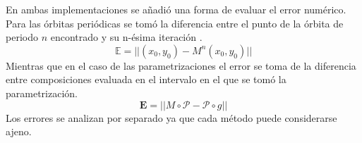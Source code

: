 En ambas implementaciones se añadi\'o una forma de evaluar el error num\'erico. Para las \'orbitas peri\'odicas se tom\'o la diferencia entre el punto de la \'orbita de periodo $n$ encontrado y su n-\'esima iteraci\'on .
\begin{equation}
	\mathbb{E} = ||(x_{0},y_{0})-M^{n}(x_{0},y_{0})||
	\label{errororbitasperiodicas}
\end{equation}
Mientras que en el caso de las parametrizaciones el error se toma de la diferencia entre composiciones evaluada en el intervalo en el que se tom\'o la parametrizaci\'on. 
\begin{equation}
	\mathbf{E} = || M\circ \mathcal{P}- \mathcal{P}\circ g||
\end{equation}
Los errores se analizan por separado ya que cada m\'etodo puede considerarse ajeno. 






